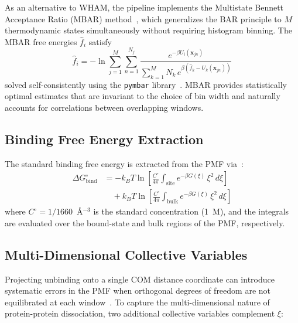 \documentclass[conference]{IEEEtran}
\begin{document}
As an alternative to WHAM, the pipeline implements the Multistate Bennett
Acceptance Ratio (MBAR) method~\cite{shirts2008}, which generalizes the
BAR principle to $M$ thermodynamic states simultaneously without requiring
histogram binning.  The MBAR free energies $\hat{f}_i$ satisfy
\begin{equation}\label{eq:mbar}
  \hat{f}_i = -\ln \sum_{j=1}^{M} \sum_{n=1}^{N_j}
  \frac{e^{-\beta U_i(\mathbf{x}_{jn})}}
  {\sum_{k=1}^{M} N_k\,e^{\beta(\hat{f}_k - U_k(\mathbf{x}_{jn}))}}
\end{equation}
solved self-consistently using the \texttt{pymbar} library~\cite{pymbar}.
MBAR provides statistically optimal estimates that are invariant to the
choice of bin width and naturally accounts for correlations between
overlapping windows.

\subsection{Binding Free Energy Extraction}\label{sec:dg}

The standard binding free energy is extracted from the PMF
via~\cite{doudou2009}:
\begin{equation}\label{eq:dg_bind}
\begin{split}
  \Delta G_{\mathrm{bind}}^{\circ} &= -k_B T \ln\!\left[
    \frac{C^{\circ}}{4\pi} \int_{\mathrm{site}}
    e^{-\beta G(\xi)}\,\xi^2\,d\xi
  \right] \\
  &\quad + k_B T \ln\!\left[
    \frac{C^{\circ}}{4\pi} \int_{\mathrm{bulk}}
    e^{-\beta G(\xi)}\,\xi^2\,d\xi
  \right]
\end{split}
\end{equation}
where $C^{\circ} = 1/1660$~\AA$^{-3}$ is the standard concentration
(1~M), and the integrals are evaluated over the bound-state and bulk
regions of the PMF, respectively.

\subsection{Multi-Dimensional Collective Variables}\label{sec:multidim_cv}

Projecting unbinding onto a single COM distance coordinate can introduce
systematic errors in the PMF when orthogonal degrees of freedom are not
equilibrated at each window~\cite{chodera2007,branduardi2007}.  To capture
the multi-dimensional nature of protein-protein dissociation, two
additional collective variables complement $\xi$:
\end{document}

